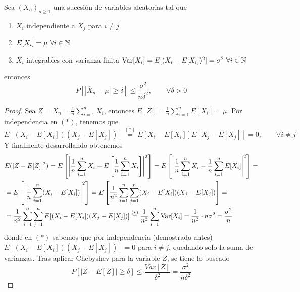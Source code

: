 \begin{teo}
    Sea $(X_n)_{n\geq 1}$ una sucesión de variables aleatorias tal que
    \begin{enumerate}[label=\arabic*)]
        \item $X_i$ independiente a $X_j$ para $i\neq j$
        \item $E[X_i]=\mu \ \forall i\in \mathbb{N}$
        \item $X_i$ integrables con varianza finita $\operatorname{Var}[X_i]=E[(X_i-E[X_i])^2]=\sigma^2\ \forall i\in \mathbb{N}$
    \end{enumerate}
    entonces
    \begin{equation*}
        P\left[\left|\overline{X}_n-\mu\right|\geq \delta\right]\leq \frac{\sigma^2}{n\delta^2},\qquad \forall \delta>0
    \end{equation*}

    \begin{proof}
    Sea $Z=\overline{X_n}=\frac{1}{n}\sum\limits_{i=1}^n X_i$, entonces $E[Z]=\frac{1}{n}\sum\limits_{i=1}^n E[X_i]=\mu$. Por independencia en $(*)$, tenemos que 
    \begin{equation*}
        E[(X_i-E[X_i])(X_j-E[X_j])]\overset{(*)}{=}E[X_i-E[X_i]]E[X_j-E[X_j]]=0, \qquad \forall i\neq j
    \end{equation*}
    Y finalmente desarrollando obtenemos
    \begin{align*}
        &E(|Z-E[Z]|^2)= E\left[\left|\dfrac{1}{n}\sum\limits_{i=1}^n X_i - E\left[\dfrac{1}{n}\sum\limits_{i=1}^n X_i\right]\right|^2\right] =E\left[\left|\dfrac{1}{n}\sum\limits_{i=1}^n X_i - \dfrac{1}{n}\sum\limits_{i=1}^nE[X_i]\right|^2\right]= \\
        &= E\left[\left|\dfrac{1}{n}\sum\limits_{i=1}^n (X_i - E[X_i])\right|^2\right] = E\left[\dfrac{1}{n^2}\sum\limits_{i=1}^n \sum\limits_{j=1}^n (X_i - E[X_i])(X_j - E[X_j])\right] = \\
        &= \dfrac{1}{n^2}\sum\limits_{i=1}^n \sum\limits_{j=1}^n E[(X_i - E[X_i])(X_j - E[X_j])] \overset{(*)}{=}\dfrac{1}{n^2}\sum\limits_{i=1}^n \operatorname{Var}[X_i] = \dfrac{1}{n^2}\cdot n \sigma^2 = \dfrac{\sigma^2}{n}
    \end{align*}
    donde en $(*)$ sabemos que por independencia (demostrado antes) $E[(X_i - E[X_i])(X_j - E[X_j])]=0$ para $i\neq j$, quedando solo la suma de varianzas. Tras aplicar Chebyshev para la variable $Z$, se tiene lo buscado
    \begin{equation*}
        P\left[\left|Z-E[Z]\right|\geq \delta\right] \leq \frac{Var[Z]}{\delta^2}= \frac{\sigma^2}{n\delta^2}
    \end{equation*}
    \end{proof}
\end{teo}

